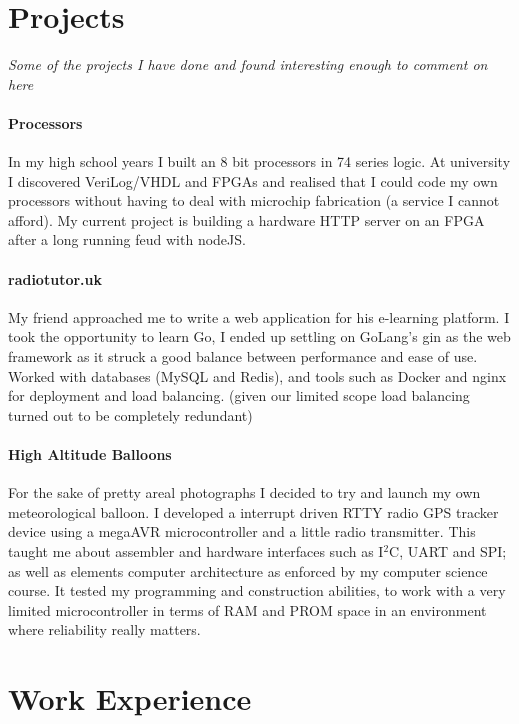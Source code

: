 \documentclass[9pt,a4paper]{article}
\begin{document}
\begin{multicols*}{2}
\section*{Projects}
\textit{Some of the projects I have done and found interesting enough to comment on here}

\paragraph{Processors} In my high school years I built an 8 bit processors in 74 series logic.
At university I discovered VeriLog/VHDL and FPGAs and realised that I could code my own processors without having to deal with microchip fabrication (a service I cannot afford).
My current project is building a hardware HTTP server on an FPGA after a long running feud with nodeJS.

\paragraph{radiotutor.uk} My friend approached me to write a web application for his e-learning platform.
I took the opportunity to learn Go, I ended up settling on GoLang's gin as the web framework as it struck a good balance between performance and ease of use.
Worked with databases (MySQL and Redis), and tools such as Docker and nginx for deployment and load balancing. (given our limited scope load balancing turned out to be completely redundant)

\paragraph{High Altitude Balloons} For the sake of pretty areal photographs I decided to try and launch my own meteorological balloon.
I developed a interrupt driven RTTY radio GPS tracker device using a megaAVR microcontroller and a little radio transmitter.
This taught me about assembler and hardware interfaces such as I$^2$C, UART and SPI;
as well as elements computer architecture as enforced by my computer science course.
It tested my programming and construction abilities, to work with a very limited microcontroller in terms of RAM and PROM space in an environment where reliability really matters.

\section*{Work Experience}


\end{multicols*}
\end{document}
